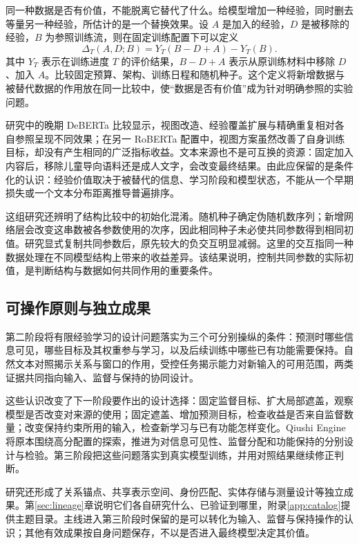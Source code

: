 同一种数据是否有价值，不能脱离它替代了什么。给模型增加一种经验，同时删去等量另一种经验，所估计的是一个替换效果。设 $A$ 是加入的经验，$D$ 是被移除的经验，$B$ 为参照训练流，则在固定训练配置下可以定义
\begin{equation}
 \Delta_T(A,D;B)=Y_T(B-D+A)-Y_T(B).
\label{eq:substitution}
\end{equation}
其中 $Y_T$ 表示在训练进度 $T$ 的评价结果，$B-D+A$ 表示从原训练材料中移除 $D$、加入 $A$。比较固定预算、架构、训练日程和随机种子。这个定义将新增数据与被替代数据的作用放在同一比较中，使“数据是否有价值”成为针对明确参照的实验问题。

研究中的晚期 DeBERTa 比较显示，视图改造、经验覆盖扩展与精确重复相对各自参照呈现不同效果；在另一 RoBERTa 配置中，视图方案虽然改善了自身训练目标，却没有产生相同的广泛指标收益。文本来源也不是可互换的资源：固定加入内容后，移除儿童导向语料还是成人文字，会改变最终结果。由此应保留的是条件化的认识：经验价值取决于被替代的信息、学习阶段和模型状态，不能从一个早期损失或一个文本分布距离推导普遍排序。

这组研究还辨明了结构比较中的初始化混淆。随机种子确定伪随机数序列；新增网络层会改变这串数被各参数使用的次序，因此相同种子未必使共同参数得到相同初值。研究显式复制共同参数后，原先较大的负交互明显减弱。这里的交互指同一种数据处理在不同模型结构上带来的收益差异。该结果说明，控制共同参数的实际初值，是判断结构与数据如何共同作用的重要条件。

\subsection{可操作原则与独立成果}

第二阶段将有限经验学习的设计问题落实为三个可分别操纵的条件：预测时哪些信息可见，哪些目标及其权重参与学习，以及后续训练中哪些已有功能需要保持。自然文本对照揭示关系与窗口的作用，受控任务揭示能力对新输入的可用范围，两类证据共同指向输入、监督与保持的协同设计。

这些认识改变了下一阶段要作出的设计选择：固定监督目标、扩大局部遮盖，观察模型是否改变对来源的使用；固定遮盖、增加预测目标，检查收益是否来自监督数量；改变保持约束所用的输入，检查新学习与已有功能怎样变化。Qiushi Engine 将原本围绕高分配置的探索，推进为对信息可见性、监督分配和功能保持的分别设计与检验。第三阶段把这些问题落实到真实模型训练，并用对照结果继续修正判断。

研究还形成了关系锚点、共享表示空间、身份匹配、实体存储与测量设计等独立成果。第\ref{sec:lineage}章说明它们各自研究什么、已验证到哪里，附录\ref{app:catalog}提供主题目录。主线进入第三阶段时保留的是可以转化为输入、监督与保持操作的认识；其他有效成果按自身问题保存，不以是否进入最终模型决定其价值。
